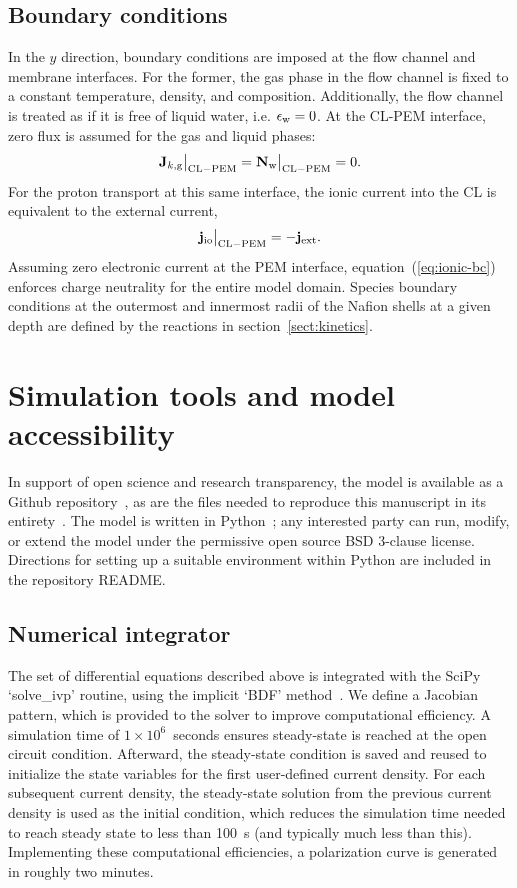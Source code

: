 \documentclass[final,3p,times,twocolumn]{elsarticle}    %
\newcommand{\crr}[1]{\color{red} #1 \color{black}}
\begin{document}
\subsection{Boundary conditions}
In the $y$ direction, boundary conditions are imposed at the flow channel and membrane interfaces. For the former, the gas phase in the flow channel is fixed to a constant temperature, density, and composition. Additionally, the flow channel is treated as if it is free of liquid water, i.e. $\epsilon_{\rm w} = 0$. At the CL-PEM interface, zero flux is assumed for the gas and liquid phases:
\begin{equation}
    {\bf J}_{k,\rm g} \big|_{\rm CL-PEM} = {\bf N}_{\rm w} \big|_{\rm CL-PEM} = 0.
\end{equation}
For the proton transport at this same interface, the ionic current into the CL is equivalent to the external current,
\begin{equation} \label{eq:ionic-bc}
    {\bf j}_{\rm io} \big|_{\rm CL-PEM} = -{\bf j}_{\rm ext}.
\end{equation}
Assuming zero electronic current at the PEM interface, equation~(\ref{eq:ionic-bc}) enforces charge neutrality for the entire model domain. Species boundary conditions at the outermost and innermost radii of the Nafion shells at a given depth are defined by the reactions in section~\ref{sect:kinetics}. 


\section{Simulation tools and model accessibility}
In support of open science and research transparency, the model is available as a Github repository~\cite{bib:randall_2021}, as are the files needed to reproduce this \crr{manuscript } in its entirety~\cite{bib:pemfc_paper_2021}. The model is written in Python~\cite{bib:python_2022}; any interested party can run, modify, or extend the model under the permissive open source BSD 3-clause license. Directions for setting up a suitable environment within Python are included in the repository README.

\subsection{Numerical integrator}
The set of differential equations described above is integrated with the SciPy `solve\_ivp' routine, using the implicit `BDF' method~\cite{bib:scipy_2022}. We define a Jacobian pattern, which is provided to the solver to improve computational efficiency. A simulation time of $1 \times 10^6$~seconds ensures steady-state is reached at the open circuit condition. Afterward, the steady-state condition is saved and reused to initialize the state variables for the first user-defined current density. For each subsequent current density, the steady-state solution from the previous current density is used as the initial condition, which reduces the simulation time needed to reach steady state to less than 100~s (and typically much less than this). Implementing these computational efficiencies, a polarization curve is generated in roughly two minutes. 
\end{document}
